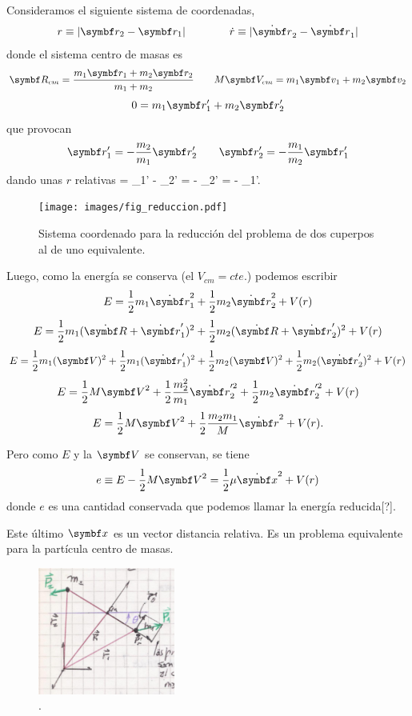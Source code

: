 \documentclass[10pt,oneside]{CBFT_book}
\begin{document}
Consideramos el siguiente sistema de coordenadas,
\[
	r \equiv | \vb{r}_2 - \vb{r}_1 | \qquad	\qquad  \dot{r} \equiv | \dot{\vb{r}}_2 - \dot{\vb{r}}_1 |
\]
donde el sistema centro de masas es
\[
	\vb{R}_{cm} = \frac{ m_1\vb{r}_1 + m_2\vb{r}_2 }{ m_1 + m_2 }	\qquad 
	M \vb{V}_{cm} =  m_1\vb{v}_1 + m_2\vb{v}_2 
\]
\[
	0 = m_1\vb{r}_1' + m_2\vb{r}_2'
\]
que provocan
\[
	\vb{r}_1' = -\frac{m_2}{m_1}\vb{r}_2' \qquad   \vb{r}_2' = -\frac{m_1}{m_2}\vb{r}_1' 
\]
dando unas $r$ relativas
\be
	 = _1' - _2' = - _2' = - _1'.
	\label{r_relativas}
\ee

\begin{figure}[hbt]
	\begin{center}
	\texttt{[image: images/fig\_reduccion.pdf]}	 
	\end{center}
	\caption{Sistema coordenado para la reducción del problema de dos cuperpos al de uno equivalente.}
\end{figure} 

Luego, como la energía se conserva (el $V_{cm}=cte.$) podemos escribir
\[
	E = \frac{1}{2} m_1 \dot{\vb{r}}_1^2 + \frac{1}{2} m_2 \dot{\vb{r}}_2^2 + V(r)
\]
\[
	E = \frac{1}{2} m_1 ( \dot{\vb{R}} + \dot{\vb{r}}_1' )^2 + \frac{1}{2} m_2 ( \dot{\vb{R}} + \dot{\vb{r}}_2' )^2 + V(r)
\]
\[
	E = \frac{1}{2} m_1 ( {\vb{V}} )^2 +  \frac{1}{2} m_1 ( \dot{\vb{r}}_1' )^2 + 
		\frac{1}{2} m_2 ( {\vb{V}})^2 + \frac{1}{2} m_2 (\dot{\vb{r}}_2' )^2 + V(r)
\]
\[
	E = \frac{1}{2} M {\vb{V}}^2 + \frac{1}{2} \frac{m_2^2}{m_1} \dot{\vb{r}}_2'^2 + \frac{1}{2} m_2 \dot{\vb{r}}_2'^2 + V(r)
\]
\[
	E = \frac{1}{2} M {\vb{V}}^2 + \frac{1}{2} \frac{m_2 m_1}{M} \dot{\vb{r}}^2 + V(r).
\]

Pero como $E$ y la $\vb{V}$ se conservan, se tiene 
\[
	e \equiv E - \frac{1}{2} M {\vb{V}}^2 =  \frac{1}{2} \mu \dot{\vb{x}}^2 + V(r)
\]
donde $e$ es una cantidad conservada que podemos llamar la energía reducida[?].

Este último $\vb{x}$ es un vector distancia relativa. Es un problema equivalente para la partícula
centro de masas.

\begin{figure}[hbt]
	\begin{center}
	\includegraphics[width=0.4\textwidth]{images/fig_mc_prob_equiv.pdf}	 
	\end{center}
	\caption{.}
	\label{fig_mc_prob_equiv}
\end{figure} 
\end{document}
